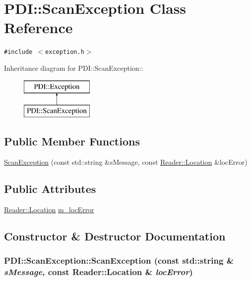 \hypertarget{class_p_d_i_1_1_scan_exception}{
\section{PDI::ScanException Class Reference}
\label{class_p_d_i_1_1_scan_exception}
}
{\tt \#include $<$exception.h$>$}

Inheritance diagram for PDI::ScanException::\begin{figure}[H]
\begin{center}
\leavevmode
\includegraphics[height=2cm]{class_p_d_i_1_1_scan_exception}
\end{center}
\end{figure}
\subsection*{Public Member Functions}
\begin{CompactItemize}
\item 
\hyperlink{class_p_d_i_1_1_scan_exception_53107304ea968d95bc5b5e9fff7dfb7d}{ScanException} (const std::string \&sMessage, const \hyperlink{struct_p_d_i_1_1_reader_1_1_location}{Reader::Location} \&locError)
\end{CompactItemize}
\subsection*{Public Attributes}
\begin{CompactItemize}
\item 
\hyperlink{struct_p_d_i_1_1_reader_1_1_location}{Reader::Location} \hyperlink{class_p_d_i_1_1_scan_exception_0e9a36903300a3afcfffcff14898f1db}{m\_\-locError}
\end{CompactItemize}


\subsection{Constructor \& Destructor Documentation}
\hypertarget{class_p_d_i_1_1_scan_exception_53107304ea968d95bc5b5e9fff7dfb7d}{
\subsubsection[{ScanException}]{\setlength{\rightskip}{0pt plus 5cm}PDI::ScanException::ScanException (const std::string \& {\em sMessage}, \/  const {\bf Reader::Location} \& {\em locError})}}
\label{class_p_d_i_1_1_scan_exception_53107304ea968d95bc5b5e9fff7dfb7d}




